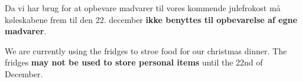 \documentclass{article}
\begin{document}
\maketitle
\null

\vspace{-1cm}

\begin{center}


\vspace{-0.8cm}

\Huge
Da vi har brug for at opbevare madvarer til vores kommende julefrokost må køleskabene frem til den 22. december {\color{red}\bf ikke benyttes til opbevarelse af egne madvarer}.


\english


\vspace{-1.1cm}

We are currently using the fridges to stroe food for our christmas dinner. The fridges {\color{red}\bf may not be used to store personal items} until the 22nd of December.

\end{center}

\dansk

\underskriv
\end{document}
